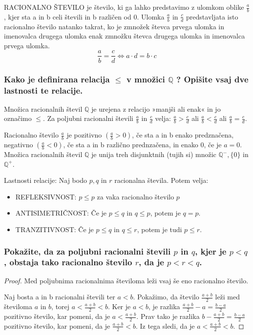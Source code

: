 \documentclass{article}
\begin{document}
RACIONALNO ŠTEVILO je število, ki ga lahko predstavimo z ulomkom oblike $\frac{a}{b}$ , kjer sta a in b celi števili in b različen od 0. Ulomka $\frac{a}{b}$ in $\frac{c}{d}$ predstavljata isto racionalno število natanko takrat, ko je zmnožek števca prvega ulomka in imenovalca drugega ulomka enak zmnožku števca drugega ulomka in imenovalca prvega ulomka.
\begin{equation*}
    \frac{a}{b} = \frac{c}{d} \Leftrightarrow a \cdot d = b \cdot c
\end{equation*}
\subsubsection*{Kako je definirana relacija $\leq$ v množici $\mathbb{Q}$ ? Opišite vsaj dve lastnosti te relacije.}

Množica racionalnih števil $\mathbb{Q}$ je urejena z relacijo »manjši ali enak« in jo označimo $\leq$. Za poljubni racionalni števili $\frac{a}{b}$ in $\frac{c}{d}$ velja: $\frac{a}{b}>\frac{c}{d}$ ali $\frac{a}{b}<\frac{c}{d}$ ali $\frac{a}{b}=\frac{c}{d}$.

Racionalno število $\frac{a}{b}$ je pozitivno $\left(\frac{a}{b}>0\right)$, če sta a in b enako predznačena, negativno $\left(\frac{a}{b}<0\right)$, če sta a in b različno prednzačena, in enako 0, če je $a=0$. Množica racionalnih števil $\mathbb{Q}$ je unija treh disjunktnih (tujih si) množic $\mathbb{Q}^{-},\{0\}$ in $\mathbb{Q}^{+}$.

Lastnosti relacije: Naj bodo $p, q$ in $r$ racionalna števila. Potem velja:
\begin{itemize}
\item REFLEKSIVNOST: $p \leq p$ za vaka racionalno število $p$
\item ANTISIMETRIČNOST: Če je $p \leq q$ in $q \leq p$, potem je $q=p$.
\item TRANZITIVNOST: Če je $p \leq q$ in $q \leq r$, potem je tudi $p \leq r$.
\end{itemize}

\subsubsection*{Pokažite, da za poljubni racionalni števili $p$ in $q$, kjer je $p<q$, obstaja tako racionalno število $r$, da je $p<r<q$.}
\begin{proof}
    Med poljubnima racionalnima številoma leži vsaj še eno racionalno število.

    Naj bosta a in b racionalni števili ter $a<b$. Pokažimo, da število $\frac{a+b}{2}$ leži med številoma $a$ in $b$, torej $a<\frac{a+b}{2}<b$. Ker je $a<b$, je razlika $\frac{a+b}{2}-a=\frac{b-a}{2}$ pozitivno število, kar pomeni, da je $a<\frac{a+b}{2}$. Prav tako je razlika $b-\frac{a+b}{2}=\frac{b-a}{2}$ pozitivno število, kar pomeni, da je $\frac{a+b}{2}<b$. Iz tega sledi, da je $a<\frac{a+b}{2}<b$.
\end{proof}
\end{document}
